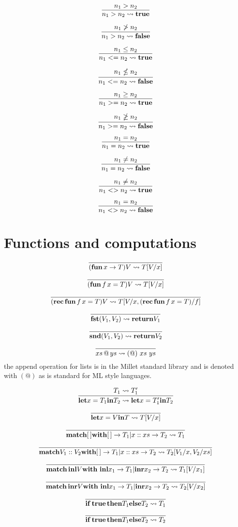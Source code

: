 \documentclass{article}
\begin{document}
\[\infer{ n_1 > n_2 \leadsto \mathbf{true}}{n_1 > n_2}\]

\[\infer{ n_1 > n_2 \leadsto \mathbf{false}}{n_1 \ngtr n_2}\]

\[\infer{ n_1 <= n_2 \leadsto \mathbf{true}}{ n_1 \leq n_2}\]

\[\infer{ n_1 <= n_2 \leadsto \mathbf{false}}{ n_1 \nleq n_2}\]

\[\infer{ n_1 >= n_2 \leadsto \mathbf{true}}{ n_1 \geq n_2}\]

\[\infer{ n_1 >= n_2 \leadsto \mathbf{false}}{ n_1 \ngeq n_2}\]

\[\infer{ n_1 = n_2 \leadsto \mathbf{true}}{n_1 = n_2}\]

\[\infer{ n_1 = n_2 \leadsto \mathbf{false}}{n_1 \neq n_2}\]

\[\infer{ n_1 <> n_2 \leadsto \mathbf{true}}{n_1 \neq n_2}\]

\[\infer{ n_1 <> n_2 \leadsto \mathbf{false}}{n_1 = n_2}\]

\section{Functions and computations}

\[\infer{ (\mathbf{fun}\,x \to T)V \leadsto T[V/x]}{}\]

\[\infer{ (\mathbf{fun}\, f \,x = T)V \leadsto T[V/x]}{}\]

\[\infer{ (\mathbf{rec}\, \mathbf{fun}\, f \,x = T)V \leadsto T[V/x,(\mathbf{rec} \, \mathbf{fun}\, f \,x = T)/f]}{}\]

\[\infer{ \mathbf{fst} (V_1,V_2) \leadsto \mathbf{return} V_1}{}\]

\[\infer{ \mathbf{snd} (V_1,V_2) \leadsto \mathbf{return} V_2}{}\]

\[\infer{ xs\, @ \, ys \leadsto (@)\,\, xs \,\, ys}{}\]
the append operation for lists is in the Millet standard library and is denoted with $(@)$ as is standard for ML style languages.

\[\infer{ \mathbf{let} x = T_1 \mathbf{in} T_2 \leadsto  \mathbf{let} x = T_1' \mathbf{in} T_2}{T_1 \leadsto T_1'}\]

\[\infer{ \mathbf{let} x = V \mathbf{in} T \leadsto T[V/x]}{}\]

\[\infer{ \mathbf{match} [\,] \mathbf{with} [\,] \to T_1 | x::xs \to T_2 \leadsto T_1}{}\]

\[\infer{ \mathbf{match} V_1::V_2 \mathbf{with} [\,] \to T_1 | x::xs \to T_2 \leadsto T_2[V_1/x, V_2/xs]}{}\]

\[\infer{ \mathbf{match}\, \mathbf{inl} V \mathbf{with}\,\,\mathbf{inl} x_1 \to T_1 | \mathbf{inr} x_2 \to T_2 \leadsto T_1[V/x_1]}{}\]

\[\infer{ \mathbf{match}\, \mathbf{inr} V \mathbf{with}\,\,\mathbf{inl} x_1 \to T_1 | \mathbf{inr} x_2 \to T_2 \leadsto T_2[V/x_2]}{}\]

\[\infer{ \mathbf{if} \, \mathbf{true}\, \mathbf{then} T_1 \mathbf{else} T_2 \leadsto T_1}{}\]

\[\infer{ \mathbf{if} \, \mathbf{true}\, \mathbf{then} T_1 \mathbf{else} T_2 \leadsto T_2}{}\]
\end{document}
